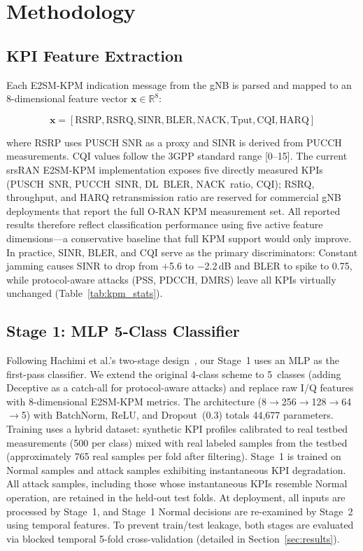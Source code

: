 \documentclass[conference]{IEEEtran}
\begin{document}
\section{Methodology}
\label{sec:methodology}

\subsection{KPI Feature Extraction}

Each E2SM-KPM indication message from the gNB is parsed and mapped to an 8-dimensional feature vector $\mathbf{x} \in \mathbb{R}^8$:

\begin{equation}
\mathbf{x} = [\text{RSRP}, \text{RSRQ}, \text{SINR}, \text{BLER}, \text{NACK}, \text{Tput}, \text{CQI}, \text{HARQ}]
\end{equation}

\noindent where RSRP uses PUSCH SNR as a proxy and SINR is derived from PUCCH measurements. CQI values follow the 3GPP standard range [0--15]. The current srsRAN E2SM-KPM implementation exposes five directly measured KPIs (PUSCH~SNR, PUCCH~SINR, DL~BLER, NACK~ratio, CQI); RSRQ, throughput, and HARQ retransmission ratio are reserved for commercial gNB deployments that report the full O-RAN KPM measurement set. All reported results therefore reflect classification performance using five active feature dimensions---a conservative baseline that full KPM support would only improve. In practice, SINR, BLER, and CQI serve as the primary discriminators: Constant jamming causes SINR to drop from $+$5.6 to $-$2.2\,dB and BLER to spike to 0.75, while protocol-aware attacks (PSS, PDCCH, DMRS) leave all KPIs virtually unchanged (Table~\ref{tab:kpm_stats}).

\subsection{Stage 1: MLP 5-Class Classifier}

Following Hachimi et al.'s two-stage design~\cite{hachimi2020}, our Stage~1 uses an MLP as the first-pass classifier. We extend the original 4-class scheme to 5~classes (adding Deceptive as a catch-all for protocol-aware attacks) and replace raw I/Q features with 8-dimensional E2SM-KPM metrics. The architecture (8$\rightarrow$256$\rightarrow$128$\rightarrow$64$\rightarrow$5) with BatchNorm, ReLU, and Dropout~(0.3) totals 44,677 parameters. Training uses a hybrid dataset: synthetic KPI profiles calibrated to real testbed measurements (500 per class) mixed with real labeled samples from the testbed (approximately 765 real samples per fold after filtering). Stage~1 is trained on Normal samples and attack samples exhibiting instantaneous KPI degradation. All attack samples, including those whose instantaneous KPIs resemble Normal operation, are retained in the held-out test folds. At deployment, all inputs are processed by Stage~1, and Stage~1 Normal decisions are re-examined by Stage~2 using temporal features. To prevent train/test leakage, both stages are evaluated via blocked temporal 5-fold cross-validation (detailed in Section~\ref{sec:results}).
\end{document}
